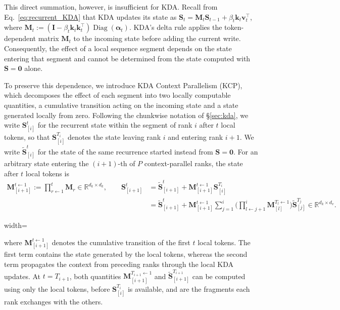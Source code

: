 This direct summation, however, is insufficient for KDA.
Recall from Eq.~\ref{eq:recurrent_KDA} that KDA updates its state as $\mathbf{S}_t=\mathbf{M}_t\mathbf{S}_{t-1}+\beta_t\bm{k}_t\bm{v}_t^{\top}$, where $\mathbf{M}_t:=\left(\mathbf{I}-\beta_t\bm{k}_t\bm{k}_t^{\top}\right)\operatorname{Diag}(\bm{\alpha}_t)$.
KDA's delta rule applies the token-dependent matrix $\mathbf{M}_t$ to the incoming state before adding the current write.
Consequently, the effect of a local sequence segment depends on the state entering that segment and cannot be determined from the state computed with $\mathbf{S}=\mathbf{0}$ alone.

To preserve this dependence, we introduce KDA Context Parallelism (KCP), which decomposes the effect of each segment into two locally computable quantities, a cumulative transition acting on the incoming state and a state generated locally from zero.
Following the chunkwise notation of \S\ref{sec:kda}, we write $\mathbf{S}_{[i]}^{t}$ for the recurrent state within the segment of rank $i$ after $t$ local tokens, so that $\mathbf{S}_{[i]}^{T_i}$ denotes the state leaving rank $i$ and entering rank $i+1$.
We write $\widetilde{\mathbf{S}}_{[i]}^{t}$ for the state of the same recurrence started instead from $\mathbf{S}=\mathbf{0}$.
For an arbitrary state entering the $(i+1)$-th of $P$ context-parallel ranks, the state after $t$ local tokens is
\begin{equation}
    \begin{aligned}
        \mathbf{M}_{[i+1]}^{t \leftarrow 1}
        := \prod_{r \leftarrow 1}^{t}\mathbf{M}_r \in \mathbb{R}^{d_k\times d_k},
        \qquad   \mathbf{S}_{[i+1]}^{t}
         & =\widetilde{\mathbf{S}}_{[i+1]}^{t} + \mathbf{M}_{[i+1]}^{t \leftarrow 1}\mathbf{S}_{[i]}^{T_i}                                                                                                                                    \\
         & = \widetilde{\mathbf{S}}_{[i+1]}^{t} + \mathbf{M}_{[i+1]}^{t \leftarrow 1}\sum_{j=1}^{i}\Big(\prod_{l \leftarrow j+1}^{i}\mathbf{M}_{[l]}^{T_l \leftarrow 1}\Big)\widetilde{\mathbf{S}}_{[j]}^{T_j}\in \mathbb{R}^{d_k\times d_v}.
    \end{aligned}
    \label{eq:kcp-compose}
\end{equation}
\begin{center}
    \begin{adjustbox}{width=\linewidth}
        
    \end{adjustbox}
\end{center}
where $\mathbf{M}_{[i+1]}^{t \leftarrow 1}$ denotes the cumulative transition of the first $t$ local tokens.
The first term contains the state generated by the local tokens, whereas the second term propagates the context from preceding ranks through the local KDA updates.
At $t=T_{i+1}$, both quantities $\mathbf{M}_{[i+1]}^{T_{i+1} \leftarrow 1}$ and $\widetilde{\mathbf{S}}_{[i+1]}^{T_{i+1}}$ can be computed using only the local tokens, before $\mathbf{S}_{[i]}^{T_i}$ is available, and are the fragments each rank exchanges with the others.

